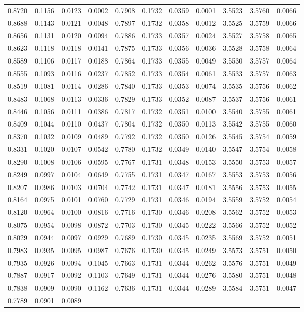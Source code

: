 \begin{table}[H]
\begin{tabular}{rrrrrrrrrrr}
        0.8720 & 0.1156 & 0.0123 & 0.0002 & 0.7908 & 0.1732 & 0.0359 & 0.0001 & 3.5523 & 3.5760 & 0.0066 \\0.8688 & 0.1143 & 0.0121 & 0.0048 & 0.7897 & 0.1732 & 0.0358 & 0.0012 & 3.5525 & 3.5759 & 0.0066 \\0.8656 & 0.1131 & 0.0120 & 0.0094 & 0.7886 & 0.1733 & 0.0357 & 0.0024 & 3.5527 & 3.5758 & 0.0065 \\0.8623 & 0.1118 & 0.0118 & 0.0141 & 0.7875 & 0.1733 & 0.0356 & 0.0036 & 3.5528 & 3.5758 & 0.0064 \\0.8589 & 0.1106 & 0.0117 & 0.0188 & 0.7864 & 0.1733 & 0.0355 & 0.0049 & 3.5530 & 3.5757 & 0.0064 \\0.8555 & 0.1093 & 0.0116 & 0.0237 & 0.7852 & 0.1733 & 0.0354 & 0.0061 & 3.5533 & 3.5757 & 0.0063 \\0.8519 & 0.1081 & 0.0114 & 0.0286 & 0.7840 & 0.1733 & 0.0353 & 0.0074 & 3.5535 & 3.5756 & 0.0062 \\0.8483 & 0.1068 & 0.0113 & 0.0336 & 0.7829 & 0.1733 & 0.0352 & 0.0087 & 3.5537 & 3.5756 & 0.0061 \\0.8446 & 0.1056 & 0.0111 & 0.0386 & 0.7817 & 0.1732 & 0.0351 & 0.0100 & 3.5540 & 3.5755 & 0.0061 \\0.8409 & 0.1044 & 0.0110 & 0.0437 & 0.7804 & 0.1732 & 0.0350 & 0.0113 & 3.5542 & 3.5755 & 0.0060 \\0.8370 & 0.1032 & 0.0109 & 0.0489 & 0.7792 & 0.1732 & 0.0350 & 0.0126 & 3.5545 & 3.5754 & 0.0059 \\0.8331 & 0.1020 & 0.0107 & 0.0542 & 0.7780 & 0.1732 & 0.0349 & 0.0140 & 3.5547 & 3.5754 & 0.0058 \\0.8290 & 0.1008 & 0.0106 & 0.0595 & 0.7767 & 0.1731 & 0.0348 & 0.0153 & 3.5550 & 3.5753 & 0.0057 \\0.8249 & 0.0997 & 0.0104 & 0.0649 & 0.7755 & 0.1731 & 0.0347 & 0.0167 & 3.5553 & 3.5753 & 0.0056 \\0.8207 & 0.0986 & 0.0103 & 0.0704 & 0.7742 & 0.1731 & 0.0347 & 0.0181 & 3.5556 & 3.5753 & 0.0055 \\0.8164 & 0.0975 & 0.0101 & 0.0760 & 0.7729 & 0.1731 & 0.0346 & 0.0194 & 3.5559 & 3.5752 & 0.0054 \\0.8120 & 0.0964 & 0.0100 & 0.0816 & 0.7716 & 0.1730 & 0.0346 & 0.0208 & 3.5562 & 3.5752 & 0.0053 \\0.8075 & 0.0954 & 0.0098 & 0.0872 & 0.7703 & 0.1730 & 0.0345 & 0.0222 & 3.5566 & 3.5752 & 0.0052 \\0.8029 & 0.0944 & 0.0097 & 0.0929 & 0.7689 & 0.1730 & 0.0345 & 0.0235 & 3.5569 & 3.5752 & 0.0051 \\0.7983 & 0.0935 & 0.0095 & 0.0987 & 0.7676 & 0.1730 & 0.0345 & 0.0249 & 3.5573 & 3.5751 & 0.0050 \\0.7935 & 0.0926 & 0.0094 & 0.1045 & 0.7663 & 0.1731 & 0.0344 & 0.0262 & 3.5576 & 3.5751 & 0.0049 \\0.7887 & 0.0917 & 0.0092 & 0.1103 & 0.7649 & 0.1731 & 0.0344 & 0.0276 & 3.5580 & 3.5751 & 0.0048 \\0.7838 & 0.0909 & 0.0090 & 0.1162 & 0.7636 & 0.1731 & 0.0344 & 0.0289 & 3.5584 & 3.5751 & 0.0047 \\0.7789 & 0.0901 & 0.0089 & 
\end{tabular}
\end{table}
